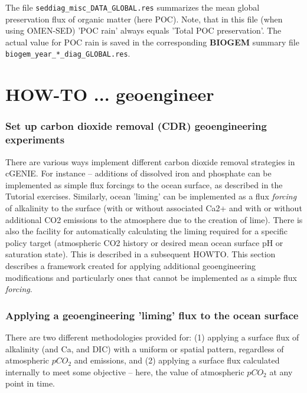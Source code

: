 \documentclass[11pt,fleqn]{book} %
\begin{document}
The file \texttt{seddiag\_misc\_DATA\_GLOBAL.res} summarizes the mean global preservation flux of organic matter (here POC). Note, that in this file (when using OMEN-SED) 'POC rain' always equals 'Total POC preservation'. The actual value for
POC rain is saved in the corresponding \textbf{BIOGEM} summary file \texttt{biogem\_year\_*\_diag\_GLOBAL.res}.


\newpage


\section{HOW-TO ... geoengineer}

\subsubsection{Set up carbon dioxide removal (CDR) geoengineering experiments}

There are various ways implement different carbon dioxide removal strategies in cGENIE. For instance -- additions of dissolved iron and phosphate can be implemented as simple flux forcings to the ocean surface, as described in the Tutorial exercises. Similarly, ocean 'liming'
 can be implemented as a flux \textit{forcing} of alkalinity to the surface (with or without associated Ca2+ and with or without additional CO2 emissions to the atmosphere due to the creation of lime).
There is also the facility for automatically calculating the liming required for a specific policy target (atmospheric CO2 history or desired mean ocean surface pH or saturation state). This is described in a subsequent HOWTO.
This section describes a framework created for applying additional geoengineering modifications and particularly ones that cannot be implemented as a simple flux \textit{forcing}.

%
\subsubsection{Applying a geoengineering 'liming' flux to the ocean surface}
\vspace{1mm}

There are two different methodologies provided for: (1) applying a surface flux of alkalinity (and Ca, and DIC) with a uniform or spatial pattern, regardless of atmospheric \(pCO_{2}\) and emissions, and (2) applying a surface flux calculated internally to meet some objective -- here, the value of atmospheric \(pCO_{2}\) at any point in time.
\end{document}

